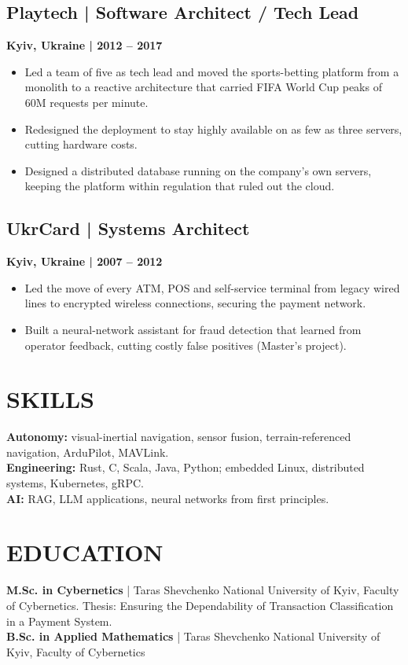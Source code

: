 \documentclass[11pt,a4paper]{article}
\newcommand{\role}[3]{\Needspace*{6\baselineskip}\subsection*{#1 | #2}\textbf{#3}\par}
\begin{document}
\vspace{1em}
\role{Playtech}{Software Architect / Tech Lead}{Kyiv, Ukraine | 2012 -- 2017}
\begin{itemize}
    \item Led a team of five as tech lead and moved the sports-betting platform from a monolith to a reactive architecture that carried FIFA World Cup peaks of 60M requests per minute.
    \item Redesigned the deployment to stay highly available on as few as three servers, cutting hardware costs.
    \item Designed a distributed database running on the company's own servers, keeping the platform within regulation that ruled out the cloud.
\end{itemize}

\vspace{1em}
\role{UkrCard}{Systems Architect}{Kyiv, Ukraine | 2007 -- 2012}
\begin{itemize}
    \item Led the move of every ATM, POS and self-service terminal from legacy wired lines to encrypted wireless connections, securing the payment network.
    \item Built a neural-network assistant for fraud detection that learned from operator feedback, cutting costly false positives (Master's project).
\end{itemize}

\section*{SKILLS}
\textbf{Autonomy:} visual-inertial navigation, sensor fusion, terrain-referenced navigation, ArduPilot, MAVLink.\\
\textbf{Engineering:} Rust, C, Scala, Java, Python; embedded Linux, distributed systems, Kubernetes, gRPC.\\
\textbf{AI:} RAG, LLM applications, neural networks from first principles.

\section*{EDUCATION}
\textbf{M.Sc. in Cybernetics} | Taras Shevchenko National University of Kyiv, Faculty of Cybernetics. Thesis: Ensuring the Dependability of Transaction Classification in a Payment System.\\[0.8em]
\textbf{B.Sc. in Applied Mathematics} | Taras Shevchenko National University of Kyiv, Faculty of Cybernetics
\end{document}
